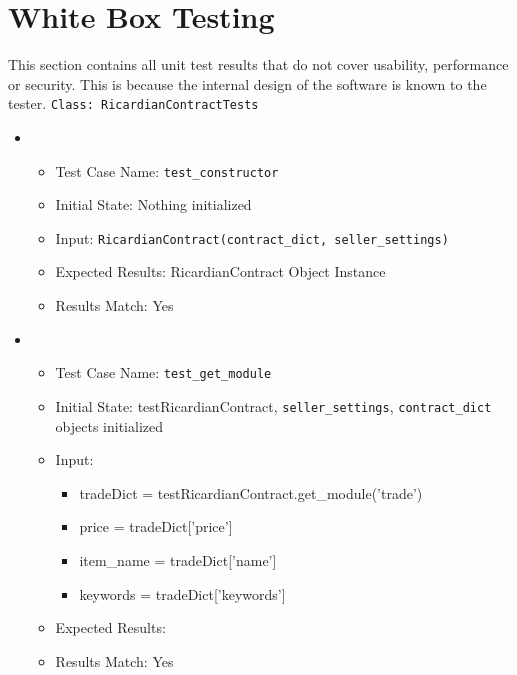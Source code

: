 \documentclass{article}
\begin{document}
\section{White Box Testing}
This section contains all unit test results that do not cover usability, performance or security. This is because the internal design of the software is known to the tester.\newline
\newline
\texttt{Class: RicardianContractTests}\newline
\begin{itemize}
\item
\begin{itemize}
\item Test Case Name: \texttt{test\_constructor}
\item Initial State: Nothing initialized
\item Input: \texttt{RicardianContract(\texttt{contract\_dict}, \texttt{seller\_settings})}
\item Expected Results: RicardianContract Object Instance
\item Results Match: Yes\newline
\end{itemize}
\end{itemize}

\begin{itemize}
\item
\begin{itemize}
\item Test Case Name: \texttt{test\_get\_module}
\item Initial State: testRicardianContract, \texttt{seller\_settings}, \texttt{contract\_dict} objects initialized
\item Input:
\begin{itemize}
\item tradeDict = testRicardianContract.get\_module('trade')
\item price = tradeDict['price']
\item item\_name = tradeDict['name']
\item keywords = tradeDict['keywords']
\end{itemize} 
\item Expected Results:
\item Results Match: Yes\newline
\end{itemize}
\end{itemize}
\end{document}

